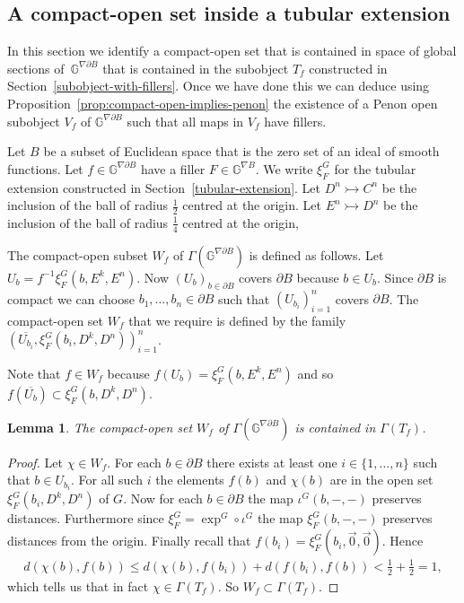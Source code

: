 \documentclass[10pt,a4paper]{amsart}
\numberwithin{equation}{section}
\newtheorem{Lemma}[Theorem]{Lemma}
\begin{document}
\subsection{A compact-open set inside a tubular extension}\label{sec:compact-open-in-tubular}

In this section we identify a compact-open set that is contained in space of global sections of~$\mathbb{G}^{\nabla\partial B}$ that is contained in the subobject $T_f$ constructed in Section~\ref{subobject-with-fillers}. Once we have done this we can deduce using Proposition~\ref{prop:compact-open-implies-penon} the existence of a Penon open subobject $V_f$ of $\mathbb{G}^{\nabla\partial B}$ such that all maps in $V_f$ have f\/illers.

\begin{Notation} Let $B$ be a subset of Euclidean space that is the zero set of an ideal of smooth functions. Let $f\in \mathbb{G}^{\nabla\partial B}$ have a f\/iller $F\in \mathbb{G}^{\nabla B}$. We write $\xi^G_F$ for the tubular extension constructed in Section~\ref{tubular-extension}. Let $D^n \rightarrowtail C^n$ be the inclusion of the ball of radius $\frac{1}{2}$ centred at the origin. Let $E^n \rightarrowtail D^n$ be the inclusion of the ball of radius $\frac{1}{4}$ centred at the origin,
\end{Notation}

\begin{Definition}The compact-open subset $W_f$ of $\Gamma(\mathbb{G}^{\nabla\partial B})$ is def\/ined as follows. Let $U_b=f^{-1}\xi^G_F(b,E^k,E^n)$. Now $(U_b)_{b\in \partial B}$ covers $\partial B$ because $b\in U_b$. Since $\partial B$ is compact we can choose $b_1,\dots ,b_n\in \partial B$ such that $(U_{b_i})_{i=1}^n$ covers $\partial B$. The compact-open set $W_f$ that we require is def\/ined by the family $(\overline{U_{b_i}},\xi^G_F(b_i,D^k,D^n))_{i=1}^n$.
\end{Definition}

\begin{Remark}Note that $f\in W_f$ because $f(U_b) = \xi^G_F(b,E^k,E^n)$ and so $f(\overline{U_b}) \subset \xi^G_F(b,D^k,D^n)$.
\end{Remark}

\begin{Lemma} The compact-open set $W_f$ of $\Gamma(\mathbb{G}^{\nabla\partial B})$ is contained in $\Gamma(T_f)$.
\end{Lemma}
 \begin{proof}Let $\chi\in W_f$. For each $b\in \partial B$ there exists at least one $i\in\{1,\dots ,n\}$ such that $b\in U_{b_i}$. For all such $i$ the elements $f(b)$ and $\chi(b)$ are in the open set $\xi^G_F(b_i,D^k,D^n)$ of $G$. Now for each $b\in\partial B$ the map $\iota^G(b,-,-)$ preserves distances. Furthermore since $\xi^G_F=\exp^G\circ \iota^G$ the map $\xi^G_F(b,-,-)$ preserves distances from the origin. Finally recall that $f(b_i)=\xi^G_F(b_i,\vec{0},\vec{0})$. Hence
 \begin{gather*}d(\chi(b),f(b))\leq d(\chi(b),f(b_i))+d(f(b_i),f(b))<\tfrac{1}{2}+\tfrac{1}{2}=1,\end{gather*}
 which tells us that in fact $\chi\in \Gamma(T_f)$.
 So $W_f\subset \Gamma(T_f)$.
 \end{proof}
\end{document}
